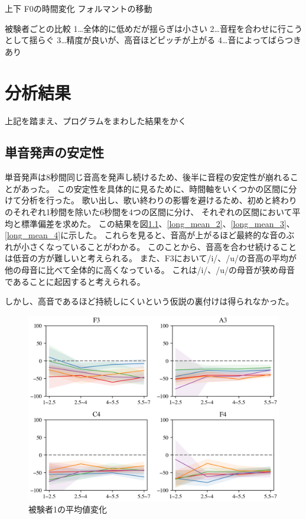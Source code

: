 \documentclass[10ptj,a4j,dvipdfmx,uplatex, oneside, openany]{jsbook}%
\begin{document}
上下
F0の時間変化
フォルマントの移動


被験者ごとの比較
1…全体的に低めだが揺らぎは小さい
2…音程を合わせに行こうとして揺らぐ
3…精度が良いが、高音ほどピッチが上がる
4…音によってばらつきあり




\chapter{分析結果}
上記を踏まえ、プログラムをまわした結果をかく

\section{単音発声の安定性}
単音発声は8秒間同じ音高を発声し続けるため、後半に音程の安定性が崩れることがあった。
この安定性を具体的に見るために、時間軸をいくつかの区間に分けて分析を行った。
歌い出し、歌い終わりの影響を避けるため、初めと終わりのそれぞれ1秒間を除いた6秒間を4つの区間に分け、
それぞれの区間において平均と標準偏差を求めた。
この結果を図\ref{long_mean_1}、\ref{long_mean_2}、\ref{long_mean_3}、\ref{long_mean_4}に示した。
これらを見ると、音高が上がるほど最終的な音のぶれが小さくなっていることがわかる。
このことから、音高を合わせ続けることは低音の方が難しいと考えられる。
また、F3において/i/、/u/の音高の平均が他の母音に比べて全体的に高くなっている。
これは/i/、/u/の母音が狭め母音であることに起因すると考えられる。

しかし、高音であるほど持続しにくいという仮説の裏付けは得られなかった。

\begin{figure}[htbp]
    \begin{center}
      \includegraphics[clip,width=12.0cm]{long_mean_1.png}
      \caption{被験者1の平均値変化}
      \label{long_mean_1}
    \end{center}
\end{figure}
\end{document}
